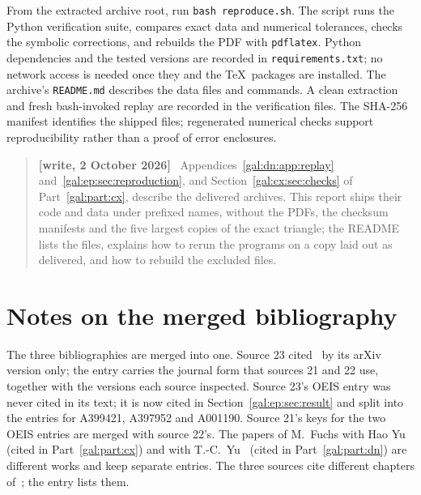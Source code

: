 \documentclass[11pt,letterpaper]{article}
\numberwithin{equation}{section}
\theoremstyle{definition}\newtheorem{definition}[theorem]{Definition}
\theoremstyle{remark}\newtheorem{remark}[theorem]{Remark}
\newenvironment{writenote}{\par\smallskip\begin{quote}\small\textbf{[write, 2 October 2026]}\ }{\end{quote}\smallskip}
\begin{document}
From the extracted archive root, run \texttt{bash reproduce.sh}. The script runs the Python verification suite, compares exact data and numerical tolerances, checks the symbolic corrections, and rebuilds the PDF with \texttt{pdflatex}. Python dependencies and the tested versions are recorded in \texttt{requirements.txt}; no network access is needed once they and the \TeX\ packages are installed. The archive's \texttt{README.md} describes the data files and commands. A clean extraction and fresh bash-invoked replay are recorded in the verification files. The SHA-256 manifest identifies the shipped files; regenerated numerical checks support reproducibility rather than a proof of error enclosures.

\begin{writenote}
Appendices~\ref{gal:dn:app:replay} and~\ref{gal:ep:sec:reproduction}, and Section~\ref{gal:cx:sec:checks} of Part~\ref{gal:part:cx}, describe the delivered archives. This report ships their code and data under prefixed names, without the PDFs, the checksum manifests and the five largest copies of the exact triangle; the README lists the files, explains how to rerun the programs on a copy laid out as delivered, and how to rebuild the excluded files.
\end{writenote}

\section*{Notes on the merged bibliography}
\label{gal:sec:bibnotes}
The three bibliographies are merged into one. Source 23 cited~\cite{comparison} by its arXiv version only; the entry carries the journal form that sources 21 and 22 use, together with the versions each source inspected. Source 23's OEIS entry was never cited in its text; it is now cited in Section~\ref{gal:ep:sec:result} and split into the entries for A399421, A397952 and A001190. Source 21's keys for the two OEIS entries are merged with source 22's. The papers of M.~Fuchs with Hao Yu~\cite{fuchs-yu} (cited in Part~\ref{gal:part:cx}) and with T.-C.~Yu~\cite{semisimplex} (cited in Part~\ref{gal:part:dn}) are different works and keep separate entries. The three sources cite different chapters of~\cite{FS}; the entry lists them.
\end{document}

